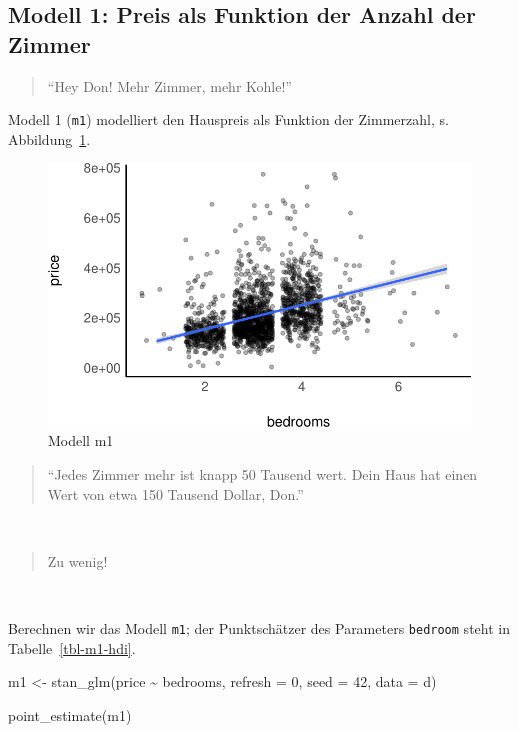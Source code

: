 \documentclass[
  a4paper,
  DIV=11]{scrreprt}
\newenvironment{Shaded}{\begin{snugshade}}{\end{snugshade}}
\newcommand{\AttributeTok}[1]{\textcolor[rgb]{0.40,0.45,0.13}{#1}}
\newcommand{\DecValTok}[1]{\textcolor[rgb]{0.68,0.00,0.00}{#1}}
\newcommand{\FunctionTok}[1]{\textcolor[rgb]{0.28,0.35,0.67}{#1}}
\newcommand{\NormalTok}[1]{\textcolor[rgb]{0.00,0.23,0.31}{#1}}
\newcommand{\OtherTok}[1]{\textcolor[rgb]{0.00,0.23,0.31}{#1}}
\newcommand{\SpecialCharTok}[1]{\textcolor[rgb]{0.37,0.37,0.37}{#1}}
\theoremstyle{definition}
\theoremstyle{remark}
\begin{document}
\hypertarget{modell-1-preis-als-funktion-der-anzahl-der-zimmer}{%
\subsection{Modell 1: Preis als Funktion der Anzahl der
Zimmer}\label{modell-1-preis-als-funktion-der-anzahl-der-zimmer}}

\begin{quote}
``Hey Don! Mehr Zimmer, mehr Kohle!'' 👩 🔬
\end{quote}

Modell 1 (\texttt{m1}) modelliert den Hauspreis als Funktion der
Zimmerzahl, s. Abbildung~\ref{fig-m1}.

\begin{figure}

{\centering \includegraphics{./kausal_files/figure-pdf/fig-m1-1.pdf}

}

\caption{\label{fig-m1}Modell m1}

\end{figure}

\begin{quote}
``Jedes Zimmer mehr ist knapp 50 Tausend wert. Dein Haus hat einen Wert
von etwa 150 Tausend Dollar, Don.''
\end{quote}

👩

\begin{quote}
Zu wenig! 🤬
\end{quote}

🧑

Berechnen wir das Modell \texttt{m1}; der Punktschätzer des Parameters
\texttt{bedroom} steht in Tabelle~\ref{tbl-m1-hdi}.

\begin{Shaded}
\begin{Highlighting}[]
\NormalTok{m1 }\OtherTok{\textless{}{-}} \FunctionTok{stan\_glm}\NormalTok{(price }\SpecialCharTok{\textasciitilde{}}\NormalTok{ bedrooms,}
               \AttributeTok{refresh =} \DecValTok{0}\NormalTok{,}
               \AttributeTok{seed =} \DecValTok{42}\NormalTok{,}
               \AttributeTok{data =}\NormalTok{ d)}

\FunctionTok{point\_estimate}\NormalTok{(m1)}
\end{Highlighting}
\end{Shaded}
\end{document}
